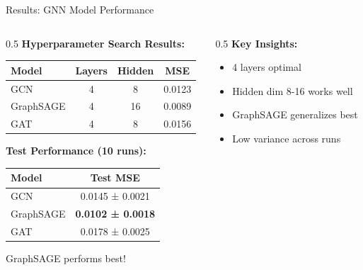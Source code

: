 \documentclass[aspectratio=169]{beamer}
\begin{document}
\begin{frame}{Results: GNN Model Performance}
    \begin{columns}[T]
        \begin{column}{0.5\textwidth}
            \textbf{Hyperparameter Search Results:}
            
            \vspace{0.3cm}
            \small
            \begin{tabular}{lccc}
                \toprule
                \textbf{Model} & \textbf{Layers} & \textbf{Hidden} & \textbf{MSE} \\
                \midrule
                GCN & 4 & 8 & 0.0123 \\
                GraphSAGE & 4 & 16 & 0.0089 \\
                GAT & 4 & 8 & 0.0156 \\
                \bottomrule
            \end{tabular}
            
            \vspace{0.5cm}
            \textbf{Test Performance (10 runs):}
            
            \vspace{0.3cm}
            \small
            \begin{tabular}{lc}
                \toprule
                \textbf{Model} & \textbf{Test MSE} \\
                \midrule
                GCN & 0.0145 ± 0.0021 \\
                GraphSAGE & \textbf{0.0102 ± 0.0018} \\
                GAT & 0.0178 ± 0.0025 \\
                \bottomrule
            \end{tabular}
            
            \vspace{0.3cm}
            \alert{GraphSAGE performs best!}
        \end{column}
        \begin{column}{0.5\textwidth}
            \centering
            \textbf{Key Insights:}
            \begin{itemize}
                \item 4 layers optimal
                \item Hidden dim 8-16 works well
                \item GraphSAGE generalizes best
                \item Low variance across runs
            \end{itemize}
        \end{column}
    \end{columns}
    

\end{frame}
\end{document}
